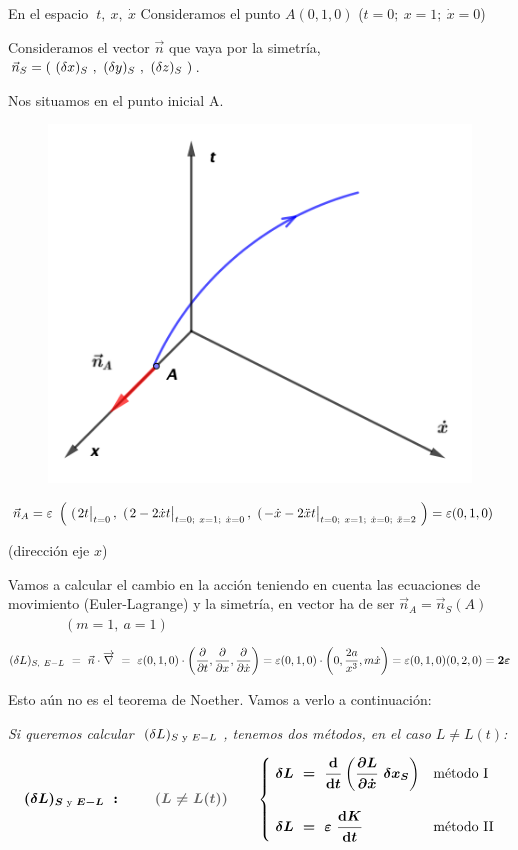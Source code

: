 \begin{multicols}{2}
En el espacio $\ t,\ x,\ \dot x$ Consideramos el punto $A(0,1,0)$
 \textcolor{gris}{($t=0;\ x=1;\ \dot x=0$)}

Consideramos el vector $\vec n$ que vaya por la simetría, $\vec n_S=( \ (\var x)_S\ , \ (\var y)_S\ , \ (\var z)_S\ )$. 

Nos situamos en el punto inicial A.
\begin{figure}[H]
	\centering
	\includegraphics[width=.35\textwidth]{imagenes/img15-04.png}
\end{figure}
\end{multicols}

$\vec n_A=\varepsilon \ \left( \ (\eval{2t}_{t=0},\  (\eval{2-2\dot x t}_{t=0;\ x=1;\ \dot x=0}, \ (\eval{-\dot x-2\ddot xt}_{t=0;\ x=1;\ \dot x=0;\ \ddot x=2} \ \right)  = \varepsilon (0,1,0)\quad $ \begin{footnotesize}(dirección eje $x$) \end{footnotesize}

\vspace{5mm} Vamos a calcular el cambio en la acción teniendo en cuenta las ecuaciones de movimiento (Euler-Lagrange) y la simetría, en vector ha de ser $\vec n_A=\vec n_S(A)$ \textcolor{gris}{$\qquad \qquad (m=1,\ a=1)$}

$\displaystyle (\var L)_{S,\ E-L} \ = \ \vec n \cdot \overrightarrow \nabla \ = \ \varepsilon (0,1,0) \cdot \left( \pdv{t},\pdv{x},\pdv{\dot x} \right) = \varepsilon (0,1,0) \cdot \left(0, \dfrac{2a}{x^3},m\dot x \right) = \varepsilon (0,1,0)(0,2,0)=\boldsymbol{2\varepsilon}$


Esto aún no es el teorema de Noether. Vamos a verlo a continuación:

\vspace{5mm}
\begin{adjustwidth}{20pt}{20pt}
\begin{destacado}
\emph{Si queremos calcular $\ (\var L)_{S\text{ y } E-L}\ $, tenemos dos métodos, en el caso $L\neq L(t)$:}

$$\boldsymbol{
(\var L)_{S\text{ y } E-L}\ :\   \qquad \textcolor{gris}{(L\neq L(t))} \qquad \begin{cases}
\ \displaystyle \var L \ = \ \dv{t} \left( \pdv{L}{\dot x} \ \var x_S \right) & \text{método I}	 \\ \\ \ \displaystyle \var L \ = \ \varepsilon \ \dv{K}{t} & \text{método II}
 \end{cases} } $$
\end{destacado}
\end{adjustwidth}


